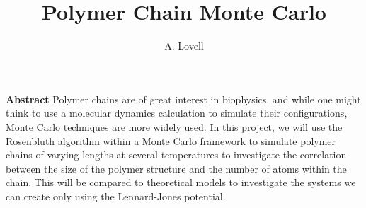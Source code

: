 \documentclass{article}
\begin{document}
\title{Polymer Chain Monte Carlo}
\author{A. Lovell}
\maketitle

\noindent \textbf{Abstract}  Polymer chains are of great interest in biophysics, and while one might think to use a molecular dynamics calculation to simulate their configurations, Monte Carlo techniques are more widely used.  In this project, we will use the Rosenbluth algorithm within a Monte Carlo framework to simulate polymer chains of varying lengths at several temperatures to investigate the correlation between the size of the polymer structure and the number of atoms within the chain.  This will be compared to theoretical models to investigate the systems we can create only using the Lennard-Jones potential.
\end{document}
